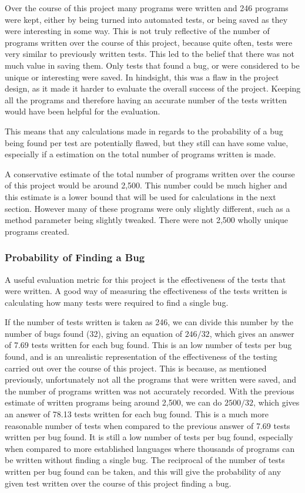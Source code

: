 Over the course of this project many programs were written and 246 programs were kept, either by being turned into automated tests, or being saved as they were interesting in some way. This is not truly reflective of the number of programs written over the course of this project, because quite often, tests were very similar to previously written tests. This led to the belief that there was not much value in saving them. Only tests that found a bug, or were considered to be unique or interesting were saved. In hindsight, this was a flaw in the project design, as it made it harder to evaluate the overall success of the project. Keeping all the programs and therefore having an accurate number of the tests written would have been helpful for the evaluation.

 This means that any calculations made in regards to the probability of a bug being found per test are potentially flawed, but they still can have some value, especially if a estimation on the total number of programs written is made.

A conservative estimate of the total number of programs written over the course of this project would be around 2,500. This number could be much higher and this estimate is a lower bound that will be used for calculations in the next section. However many of these programs were only slightly different, such as a method parameter being slightly tweaked. There were not 2,500 wholly unique programs created.

\subsubsection{Probability of Finding a Bug}

A useful evaluation metric for this project is the effectiveness of the tests that were written. A good way of measuring the effectiveness of the tests written is calculating how many tests were required to find a single bug. 

If the number of tests written is taken as 246, we can divide this number by the number of bugs found (32), giving an equation of $ 246 / 32 $, which gives an answer of 7.69 tests written for each bug found. This is an low number of tests per bug found, and is an unrealistic representation of the effectiveness of the testing carried out over the course of this project. This is because, as mentioned previously, unfortunately not all the programs that were written were saved, and the number of programs written was not accurately recorded. With the previous estimate of written programs being around 2,500, we can do $ 2500 / 32 $, which gives an answer of 78.13 tests written for each bug found. This is a much more reasonable number of tests when compared to the previous answer of 7.69 tests written per bug found. It is still a low number of tests per bug found, especially when compared to more established languages where thousands of programs can be written without finding a single bug. The reciprocal of the number of tests written per bug found can be taken, and this will give the probability of any given test written over the course of this project finding a bug.

